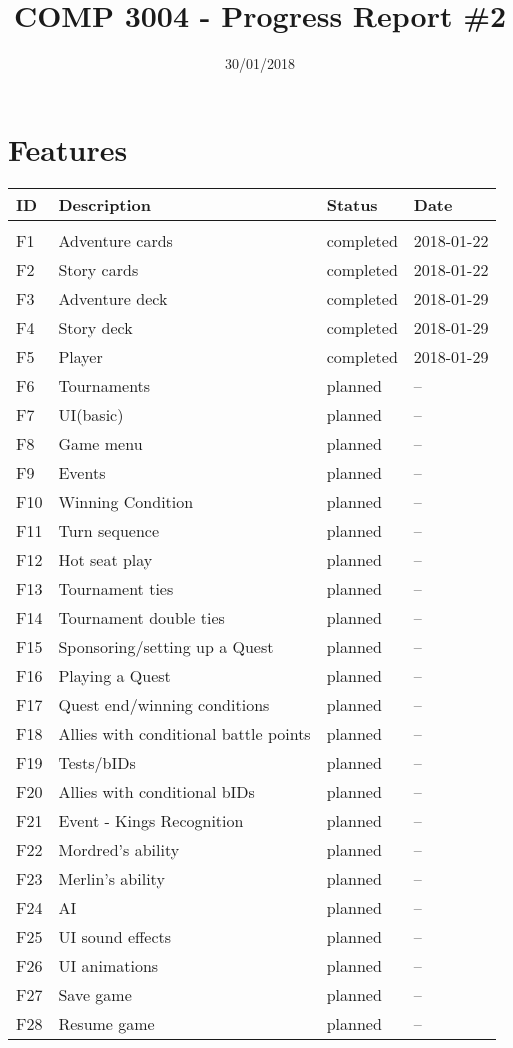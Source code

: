 \documentclass[10pt,a4paper]{article}
\title{COMP 3004 - Progress Report \#2}
\author{}
\date{30/01/2018}
\begin{document}
\section*{Features}

\begin{center}
\begin{tabular}{l l l l }
ID & Description & Status & Date\\
\hline\\
F1 & Adventure cards & completed & 2018-01-22\\
F2 & Story cards & completed & 2018-01-22\\
F3 & Adventure deck & completed & 2018-01-29\\
F4 & Story deck & completed & 2018-01-29\\
F5 & Player & completed & 2018-01-29\\
F6 & Tournaments & planned & --\\
F7 & UI(basic) & planned & --\\
F8 & Game menu & planned & --\\
F9 & Events & planned & --\\
F10 & Winning Condition & planned & --\\
F11 & Turn sequence & planned & --\\
F12 & Hot seat play & planned & --\\
F13 & Tournament ties & planned & --\\
F14 & Tournament double ties & planned & --\\
F15 & Sponsoring/setting up a Quest & planned & --\\
F16 & Playing a Quest & planned & --\\
F17 & Quest end/winning conditions & planned & --\\
F18 & Allies with conditional battle points & planned & --\\
F19 & Tests/bIDs & planned & --\\
F20 & Allies with conditional bIDs & planned & --\\
F21 & Event - Kings Recognition & planned & --\\
F22 & Mordred's ability & planned & --\\
F23 & Merlin's ability & planned & --\\
F24 & AI & planned & --\\
F25 & UI sound effects & planned & --\\
F26 & UI animations & planned & --\\
F27 & Save game & planned & --\\
F28 & Resume game & planned & --\\
\end{tabular}
\end{center}
\end{document}
